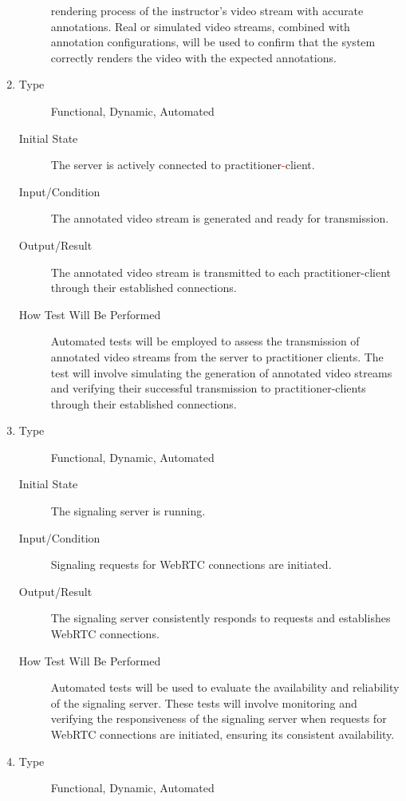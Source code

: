 \documentclass[12pt, titlepage]{article}
\newcommand{\rt}[1]{\textcolor{red}{#1}}
\begin{document}
\begin{enumerate}[FR-T1]
\begin{description}
    rendering process of the instructor's video stream with accurate
    annotations. Real or simulated video streams, combined with annotation
    configurations, will be used to confirm that the system correctly renders
    the video with the expected annotations.
  \end{description}
\item \label{FRT10}
  \begin{description}
  \item[Type] Functional, Dynamic, Automated
  \item[Initial State] The server is actively connected to practitioner\rt{-}client.
  \item[Input/Condition] The annotated video stream is generated and ready for
    transmission.
  \item[Output/Result] The annotated video stream is transmitted to each
    practitioner-client through their established connections.
  \item[How Test Will Be Performed] Automated tests will be employed to assess
    the transmission of annotated video streams from the server to practitioner
    clients. The test will involve simulating the generation of annotated video
    streams and verifying their successful transmission to practitioner-clients
    through their established connections.
  \end{description}
\item \label{FRT11}
  \begin{description}
  \item[Type] Functional, Dynamic, Automated
  \item[Initial State] The signaling server is running.
  \item[Input/Condition] Signaling requests for WebRTC connections are initiated.
  \item[Output/Result] The signaling server consistently responds to requests and
    establishes WebRTC connections.
  \item[How Test Will Be Performed] Automated tests will be used to evaluate the
    availability and reliability of the signaling server. These tests will
    involve monitoring and verifying the responsiveness of the signaling server
    when requests for WebRTC connections are initiated, ensuring its consistent
    availability.
  \end{description}
\item \label{FRT12}
  \begin{description}
  \item[Type] Functional, Dynamic, Automated

\end{description}
\end{enumerate}
\end{document}
